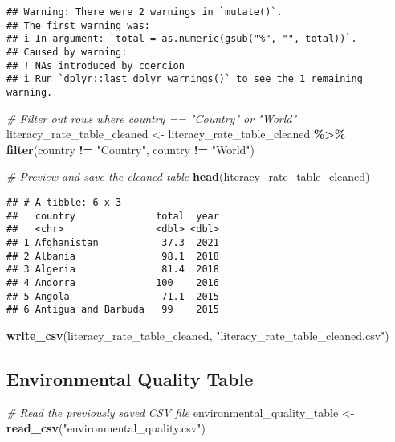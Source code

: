 \documentclass[
]{article}
\newenvironment{Shaded}{\begin{snugshade}}{\end{snugshade}}
\newcommand{\CommentTok}[1]{\textcolor[rgb]{0.56,0.35,0.01}{\textit{#1}}}
\newcommand{\FunctionTok}[1]{\textcolor[rgb]{0.13,0.29,0.53}{\textbf{#1}}}
\newcommand{\NormalTok}[1]{#1}
\newcommand{\OtherTok}[1]{\textcolor[rgb]{0.56,0.35,0.01}{#1}}
\newcommand{\SpecialCharTok}[1]{\textcolor[rgb]{0.81,0.36,0.00}{\textbf{#1}}}
\newcommand{\StringTok}[1]{\textcolor[rgb]{0.31,0.60,0.02}{#1}}
\begin{document}
\begin{verbatim}
## Warning: There were 2 warnings in `mutate()`.
## The first warning was:
## i In argument: `total = as.numeric(gsub("%", "", total))`.
## Caused by warning:
## ! NAs introduced by coercion
## i Run `dplyr::last_dplyr_warnings()` to see the 1 remaining warning.
\end{verbatim}

\begin{Shaded}
\begin{Highlighting}[]
\CommentTok{\# Filter out rows where country == "Country" or "World"}
\NormalTok{literacy\_rate\_table\_cleaned }\OtherTok{\textless{}{-}}\NormalTok{ literacy\_rate\_table\_cleaned }\SpecialCharTok{\%\textgreater{}\%}
  \FunctionTok{filter}\NormalTok{(country }\SpecialCharTok{!=} \StringTok{"Country"}\NormalTok{,              }
\NormalTok{         country }\SpecialCharTok{!=} \StringTok{"World"}\NormalTok{)    }

\CommentTok{\# Preview and save the cleaned table}
\FunctionTok{head}\NormalTok{(literacy\_rate\_table\_cleaned)}
\end{Highlighting}
\end{Shaded}

\begin{verbatim}
## # A tibble: 6 x 3
##   country              total  year
##   <chr>                <dbl> <dbl>
## 1 Afghanistan           37.3  2021
## 2 Albania               98.1  2018
## 3 Algeria               81.4  2018
## 4 Andorra              100    2016
## 5 Angola                71.1  2015
## 6 Antigua and Barbuda   99    2015
\end{verbatim}

\begin{Shaded}
\begin{Highlighting}[]
\FunctionTok{write\_csv}\NormalTok{(literacy\_rate\_table\_cleaned, }\StringTok{"literacy\_rate\_table\_cleaned.csv"}\NormalTok{)}
\end{Highlighting}
\end{Shaded}

\subsection{Environmental Quality
Table}\label{environmental-quality-table}

\begin{Shaded}
\begin{Highlighting}[]
\CommentTok{\# Read the previously saved CSV file}
\NormalTok{environmental\_quality\_table }\OtherTok{\textless{}{-}} \FunctionTok{read\_csv}\NormalTok{(}\StringTok{"environmental\_quality.csv"}\NormalTok{)}
\end{Highlighting}
\end{Shaded}
\end{document}
